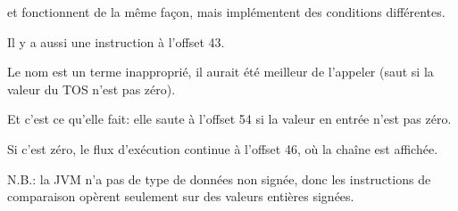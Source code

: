  et  fonctionnent de la même façon, mais implémentent
des conditions différentes.


Il y a aussi une instruction  à l'offset 43.

Le nom est un terme inapproprié, il aurait été meilleur de l'appeler  (saut
si la valeur du \ac{TOS} n'est pas zéro).

Et c'est ce qu'elle fait: elle saute à l'offset 54 si la valeur en entrée n'est pas
zéro.

Si c'est zéro, le flux d'exécution continue à l'offset 46, où la chaîne  est
affichée.


N.B.: la \ac{JVM} n'a pas de type de données non signée, donc les instructions de
comparaison opèrent seulement sur des valeurs entières signées.

